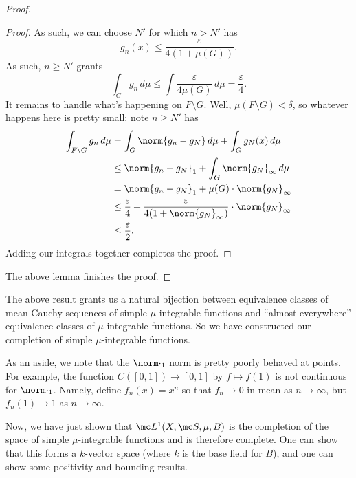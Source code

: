 \documentclass[../notes.tex]{subfiles}
\begin{document}
\begin{proof}
\begin{proof}
		As such, we can choose $N'$ for which $n>N'$ has
		\[g_n(x)\le\frac\varepsilon{4(1+\mu(G))}.\]
		As such, $n\ge N'$ grants
		\[\int_{G}g_n\,d\mu\le\int\frac\varepsilon{4\mu(G)}\,d\mu=\frac\varepsilon4.\]
		It remains to handle what's happening on $F\setminus G$. Well, $\mu(F\setminus G)<\delta$, so whatever happens here is pretty small: note $n\ge N'$ has
		\begin{align*}
			\int_{F\setminus G}g_n\,d\mu &= \int_G\norm{g_n-g_N}\,d\mu+\int_Gg_N(x)\,d\mu \\
			&\le \norm{g_n-g_N}_1+\int_G\norm{g_N}_\infty\,d\mu \\
			&= \norm{g_n-g_N}_1+\mu(G)\cdot\norm{g_N}_\infty \\
			&\le \frac\varepsilon4+\frac\varepsilon{4(1+\norm{g_N}_\infty)}\cdot\norm{g_N}_\infty \\
			&\le \frac\varepsilon2.
		\end{align*}
		Adding our integrals together completes the proof.
	\end{proof}
	The above lemma finishes the proof.
\end{proof}
The above result grants us a natural bijection between equivalence classes of mean Cauchy sequences of simple $\mu$-integrable functions and ``almost everywhere'' equivalence classes of $\mu$-integrable functions. So we have constructed our completion of simple $\mu$-integrable functions.
\begin{remark}
	As an aside, we note that the $\norm\cdot_1$ norm is pretty poorly behaved at points. For example, the function $C([0,1])\to[0,1]$ by $f\mapsto f(1)$ is not continuous for $\norm\cdot_1$. Namely, define $f_n(x)=x^n$ so that $f_n\to0$ in mean as $n\to\infty$, but $f_n(1)\to1$ as $n\to\infty$.
\end{remark}
Now, we have just shown that $\mc L^1(X,\mc S,\mu,B)$ is the completion of the space of simple $\mu$-integrable functions and is therefore complete. One can show that this forms a $k$-vector space (where $k$ is the base field for $B$), and one can show some positivity and bounding results.
\end{document}
